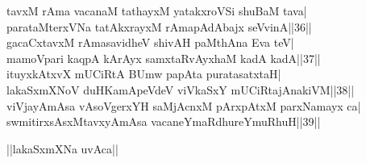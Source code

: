\documentclass{article}
\begin{document}
tavxM rAma vacanaM tathayxM yatakxroVSi shuBaM tava|\\
parataMterxVNa tatAkxrayxM rAmapAdAbajx seVvinA||36||\\
gacaCxtavxM rAmasavidheV shivAH paMthAna Eva teV|\\
mamoVpari kaqpA kArAyx samxtaRvAyxhaM kadA kadA||37||\\
ituyxkAtxvX mUCiRtA BUmw papAta puratasatxtaH|\\
lakaSxmXNoV duHKamApeVdeV viVkaSxY mUCiRtajAnakiVM||38||\\
viVjayAmAsa vAsoVgerxYH saMjAcnxM pArxpAtxM parxNamayx ca|\\
swmitirxsAsxMtavxyAmAsa vacaneYmaRdhureYmuRhuH||39||\\

\begin{center}
||lakaSxmXNa uvAca||
\end{center}
\end{document}

